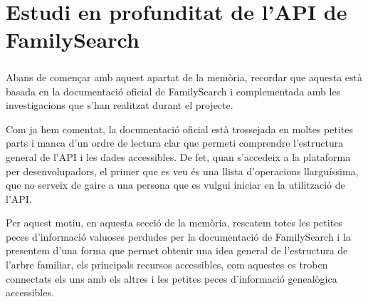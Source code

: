 \chapter{Estudi en profunditat de l'API de FamilySearch}

    \paragraph{}
    Abans de començar amb aquest apartat de la memòria, recordar que aquesta està basada en la documentació oficial de FamilySearch i complementada amb les investigacions que s'han realitzat durant el projecte.

    Com ja hem comentat, la documentació oficial està trossejada en moltes petites parts i manca d'un ordre de lectura clar que permeti comprendre l'estructura gene\-ral de l'API i les dades accessibles. De fet, quan s'accedeix a la plataforma per desenvolupadors, el primer que es veu és una llista d'operacions llarguíssima, que no serveix de gaire a una persona que es vulgui iniciar en la utilització de l'API.

    Per aquest motiu, en aquesta secció de la memòria, rescatem totes les petites peces d'informació valuoses perdudes per la documentació de FamilySearch i la presentem d'una forma que permet obtenir una idea general de l'estructura de l'arbre familiar, els principals recursos accessibles, com aquestes es troben connectats els uns amb els altres i les petites peces d'informació genealògica accessibles.

    
    
    
    
    
    
    
    
    
    
